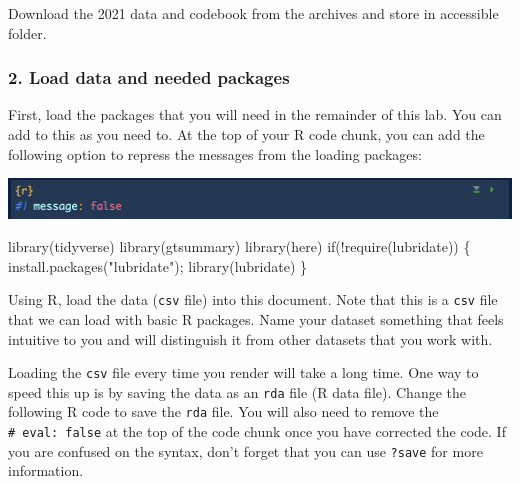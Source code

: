 \documentclass[
  letterpaper,
  DIV=11,
  numbers=noendperiod]{scrartcl}
\newenvironment{Shaded}{\begin{snugshade}}{\end{snugshade}}
\newcommand{\ControlFlowTok}[1]{\textcolor[rgb]{0.00,0.23,0.31}{#1}}
\newcommand{\FunctionTok}[1]{\textcolor[rgb]{0.28,0.35,0.67}{#1}}
\newcommand{\NormalTok}[1]{\textcolor[rgb]{0.00,0.23,0.31}{#1}}
\newcommand{\SpecialCharTok}[1]{\textcolor[rgb]{0.37,0.37,0.37}{#1}}
\newcommand{\StringTok}[1]{\textcolor[rgb]{0.13,0.47,0.30}{#1}}
\begin{document}
\begin{tcolorbox}[enhanced jigsaw, coltitle=black, bottomrule=.15mm, opacityback=0, arc=.35mm, toprule=.15mm, colbacktitle=quarto-callout-important-color!10!white, left=2mm, colback=white, opacitybacktitle=0.6, colframe=quarto-callout-important-color-frame, rightrule=.15mm, leftrule=.75mm, breakable, bottomtitle=1mm, titlerule=0mm, toptitle=1mm, title=\textcolor{quarto-callout-important-color}{\faExclamation}\hspace{0.5em}{Task Summary}]

Download the 2021 data and codebook from the archives and store in
accessible folder.

\end{tcolorbox}

\hypertarget{load-data-and-needed-packages}{%
\subsubsection{2. Load data and needed
packages}\label{load-data-and-needed-packages}}

First, load the packages that you will need in the remainder of this
lab. You can add to this as you need to. At the top of your R code
chunk, you can add the following option to repress the messages from the
loading packages:

\includegraphics{images/r_message.png}

\begin{Shaded}
\begin{Highlighting}[]
\FunctionTok{library}\NormalTok{(tidyverse)}
\FunctionTok{library}\NormalTok{(gtsummary)}
\FunctionTok{library}\NormalTok{(here)}
\ControlFlowTok{if}\NormalTok{(}\SpecialCharTok{!}\FunctionTok{require}\NormalTok{(lubridate)) \{ }\FunctionTok{install.packages}\NormalTok{(}\StringTok{"lubridate"}\NormalTok{); }\FunctionTok{library}\NormalTok{(lubridate) \}}
\end{Highlighting}
\end{Shaded}

Using R, load the data (\texttt{csv} file) into this document. Note that
this is a \texttt{csv} file that we can load with basic R packages. Name
your dataset something that feels intuitive to you and will distinguish
it from other datasets that you work with.

Loading the \texttt{csv} file every time you render will take a long
time. One way to speed this up is by saving the data as an \texttt{rda}
file (R data file). Change the following R code to save the \texttt{rda}
file. You will also need to remove the
\texttt{\#\textbar{}\ eval:\ false} at the top of the code chunk once
you have corrected the code. If you are confused on the syntax, don't
forget that you can use \texttt{?save} for more information.
\end{document}
